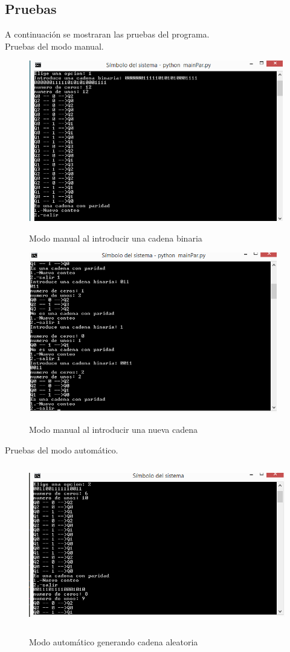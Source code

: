 \documentclass[12pt,letterpaper]{article}
\begin{document}
\subsection{Pruebas}
A continuaci\'on se mostraran las pruebas del programa.\\
Pruebas del modo manual.\\
\begin{figure}[H]
\includegraphics[width=\textwidth, height=7cm]{manualParidad.png}
\label{fig:manualparidad}
\caption{Modo manual al introducir una cadena binaria}
\end{figure}
\begin{figure}[H]
\includegraphics[width=\textwidth, height=7cm]{manualnuevaParidad.png}
\label{fig:manualnuevoparidad}
\caption{Modo manual al introducir una nueva cadena}
\end{figure}

Pruebas del modo autom\'atico.\\

\begin{figure}[H]
\includegraphics[width=\textwidth, height=7cm]{automaticoParidad.png}
\label{fig:automaticoparidad}
\caption{Modo autom\'atico generando cadena aleatoria}
\end{figure}
\end{document}
